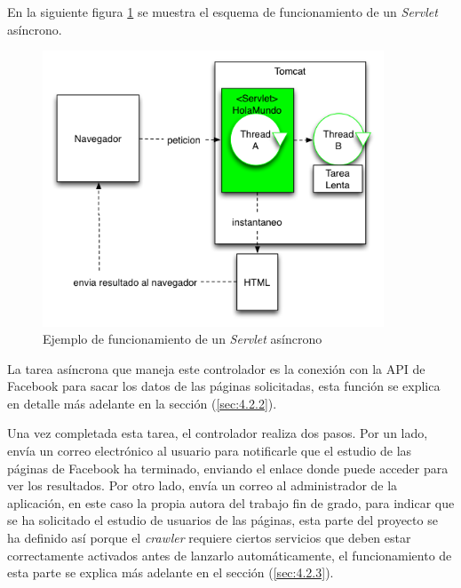 En la siguiente figura \ref{fig:sa} se muestra el esquema de funcionamiento de un \textit{Servlet} asíncrono. 
\begin{figure}[H]
\centering
\includegraphics[width=4in]{figuras/Servletasincrono.png}
\caption{Ejemplo de funcionamiento de un \textit{Servlet} asíncrono} \label{fig:sa}
\end{figure} 

La tarea asíncrona que maneja este controlador es la conexión con la API de Facebook para sacar los datos de las páginas solicitadas, esta función se explica en detalle más adelante en la sección (\ref{sec:4.2.2}). 

Una vez completada esta tarea, el controlador realiza dos pasos. Por un lado, envía un correo electrónico al usuario para notificarle que el estudio de las páginas de Facebook ha terminado, enviando el enlace donde puede acceder para ver los resultados. Por otro lado, envía un correo al administrador de la aplicación, en este caso la propia autora del trabajo fin de grado, para indicar que se ha solicitado el estudio de usuarios de las páginas, esta parte del proyecto se ha definido así porque el \textit{crawler} requiere ciertos servicios que deben estar correctamente activados antes de lanzarlo automáticamente, el funcionamiento de esta parte se explica más adelante en el sección (\ref{sec:4.2.3}).


